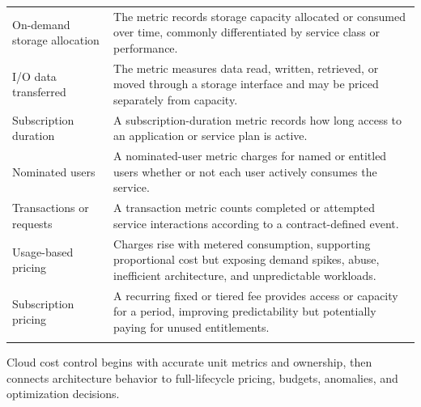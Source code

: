 \documentclass[11pt]{article}
\begin{document}
\begin{longtable}{@{}>{\RaggedRight\arraybackslash}p{}>{\RaggedRight\arraybackslash}p{}@{}}
On-demand storage allocation & The metric records storage capacity allocated or consumed over time, commonly differentiated by service class or performance. \\\addlinespace[2pt]
I/O data transferred & The metric measures data read, written, retrieved, or moved through a storage interface and may be priced separately from capacity. \\\addlinespace[2pt]
Subscription duration & A subscription-duration metric records how long access to an application or service plan is active. \\\addlinespace[2pt]
Nominated users & A nominated-user metric charges for named or entitled users whether or not each user actively consumes the service. \\\addlinespace[2pt]
Transactions or requests & A transaction metric counts completed or attempted service interactions according to a contract-defined event. \\\addlinespace[2pt]
Usage-based pricing & Charges rise with metered consumption, supporting proportional cost but exposing demand spikes, abuse, inefficient architecture, and unpredictable workloads. \\\addlinespace[2pt]
Subscription pricing & A recurring fixed or tiered fee provides access or capacity for a period, improving predictability but potentially paying for unused entitlements. \\\addlinespace[2pt]
\bottomrule
\end{longtable}
\begin{takeawaybox}
Cloud cost control begins with accurate unit metrics and ownership, then connects architecture behavior to full-lifecycle pricing, budgets, anomalies, and optimization decisions.
\end{takeawaybox}
\end{document}
